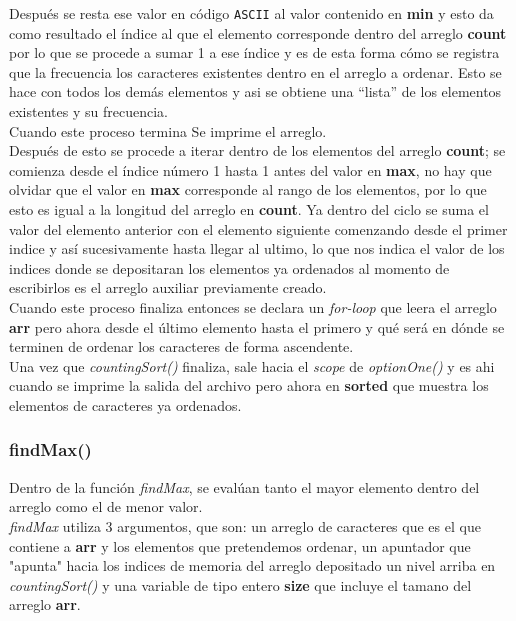 \documentclass{article}
\begin{document}
				Después se resta ese valor en código \verb|ASCII| al valor contenido en \textbf{min} y esto da como resultado el índice al que el elemento corresponde dentro del arreglo \textbf{count} por lo que se procede a sumar 1 a ese índice y es de esta forma cómo se registra que la frecuencia los caracteres existentes dentro en el arreglo a ordenar. Esto se hace con todos los demás elementos y asi se obtiene una “lista” de los elementos existentes y su frecuencia.\\
				
				Cuando este proceso termina Se imprime el arreglo.\\
				
				Después de esto se procede a iterar dentro de los elementos del arreglo \textbf{count}; se comienza desde el índice número 1 hasta 1  antes del valor en \textbf{max}, no hay que olvidar que el valor en \textbf{max} corresponde al rango de los elementos, por lo que esto es igual a la longitud del arreglo en \textbf{count}. Ya dentro del ciclo se suma el valor del elemento anterior con el elemento siguiente comenzando desde el primer indice y así sucesivamente hasta llegar al ultimo, lo que nos indica el valor de los indices donde se depositaran los elementos ya ordenados al momento de escribirlos es el arreglo auxiliar previamente creado.\\
				
				Cuando este proceso finaliza entonces se declara un \emph{for-loop} que leera el arreglo \textbf{arr} pero ahora desde el último elemento hasta el primero  y qué será en dónde se terminen de ordenar los caracteres de forma ascendente.\\
				
				Una vez que \emph{countingSort()} finaliza, sale hacia el \emph{scope} de \emph{optionOne()} y es ahi cuando se imprime la salida del archivo pero ahora en \textbf{sorted} que muestra los elementos de caracteres ya ordenados.
					
			
			\subsubsection{findMax()}
			
				Dentro de la función \emph{findMax}, se evalúan tanto el mayor elemento dentro del arreglo como el de menor valor.\\
				
				\emph{findMax} utiliza 3 argumentos, que son: un arreglo de caracteres que es el que contiene a \textbf{arr} y los elementos que pretendemos ordenar, un apuntador que "apunta" hacia los indices de memoria del arreglo depositado un nivel arriba en \emph{countingSort()} y una variable de tipo entero \textbf{size} que incluye el tamano del arreglo \textbf{arr}.\\
				
\end{document}
